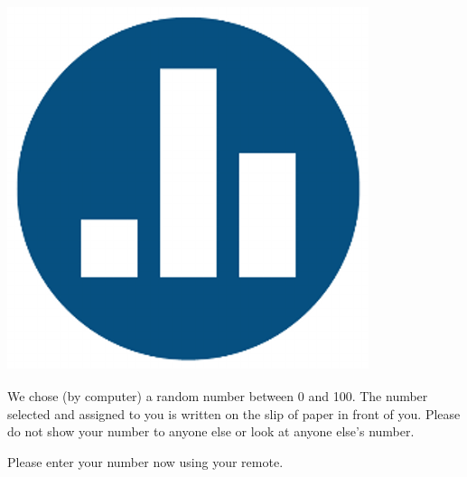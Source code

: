 \begin{frame}

\frametitle{\includegraphics[scale = 0.05]{./images/clicker}}

We chose (by computer) a random number between 0 and 100. The number selected and assigned to you is written on the slip of paper in front of you. Please do not show your number to anyone else or look at anyone else's number.

\vspace{1em}

Please enter your number now using your remote.

\end{frame}




